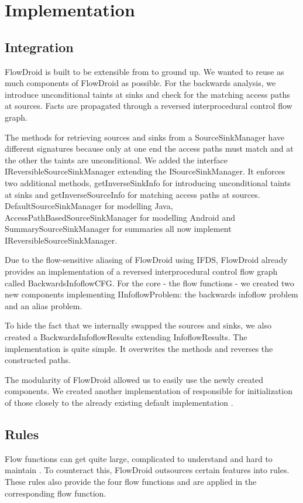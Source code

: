 \documentclass[../draft.tex]{subfiles}
\begin{document}
    \chapter{Implementation}

    \section{Integration}
    FlowDroid is built to be extensible from to ground up. We wanted to reuse as much components of FlowDroid as possible. For the backwards analysis, we introduce unconditional taints at sinks and check for the matching access paths at sources. Facts are propagated through a reversed interprocedural control flow graph.

    The methods for retrieving sources and sinks from a SourceSinkManager have different signatures because only at one end the access paths must match and at the other the taints are unconditional. 
    We added the interface IReversibleSourceSinkManager extending the ISourceSinkManager. It enforces two additional methods, getInverseSinkInfo for introducing unconditional taints at sinks and getInverseSourceInfo for matching access paths at sources. DefaultSourceSinkManager for modelling Java, AccessPathBasedSourceSinkManager for modelling Android and SummarySourceSinkManager for summaries all now implement IReversibleSourceSinkManager.

    Due to the flow-sensitive aliasing of FlowDroid using IFDS, FlowDroid already provides an implementation of a reversed interprocedural control flow graph called BackwardsInfoflowCFG.
    For the core - the flow functions - we created two new components implementing IInfoflowProblem: the backwards infoflow problem and an alias problem. 

    To hide the fact that we internally swapped the sources and sinks, we also created a BackwardsInfoflowResults extending InfoflowResults. The implementation is quite simple. It overwrites the  methods and reverses the constructed paths.

    The modularity of FlowDroid allowed us to easily use the newly created components. We created another implementation of  responsible for initialization of those closely to the already existing default implementation .

    \section{Rules}
    Flow functions can get quite large, complicated to understand and hard to maintain \cite{Lerch2015}. To counteract this, FlowDroid outsources certain features into rules. These rules also provide the four flow functions and are applied in the corresponding flow function.
\end{document}
